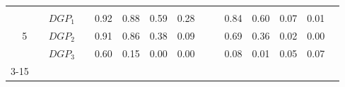 \begin{table}[htbp]
{\begin{tabular}{cc|ccccccc|cccccc|}
    & & & & & & & & & & & & & & \\
    \multicolumn{2}{c|}{\multirow{3}{*}{5}} & \multicolumn{1}{l}{$DGP_{1}$} & & \multicolumn{1}{c}{0.92} & \multicolumn{1}{c}{0.88} & \multicolumn{1}{c}{0.59} & \multicolumn{1}{c}{0.28} & & & \multicolumn{1}{c}{0.84} & \multicolumn{1}{c}{0.60} & \multicolumn{1}{c}{0.07} & \multicolumn{1}{c}{0.01} & \\
    \multicolumn{2}{c|}{} & \multicolumn{1}{l}{$DGP_{2}$} & & \multicolumn{1}{c}{0.91} & \multicolumn{1}{c}{0.86} & \multicolumn{1}{c}{0.38} & \multicolumn{1}{c}{0.09} & & & \multicolumn{1}{c}{0.69} & \multicolumn{1}{c}{0.36} & \multicolumn{1}{c}{0.02} & \multicolumn{1}{c}{0.00} & \\
    \multicolumn{2}{c|}{} & \multicolumn{1}{l}{$DGP_{3}$} & & \multicolumn{1}{c}{0.60} & \multicolumn{1}{c}{0.15} & \multicolumn{1}{c}{0.00} & \multicolumn{1}{c}{0.00} & & & \multicolumn{1}{c}{0.08} & \multicolumn{1}{c}{0.01} & \multicolumn{1}{c}{0.05} & \multicolumn{1}{c}{0.07} & \\
    \cmidrule{3-15}
    \end{tabular}
  } %
\end{table}

